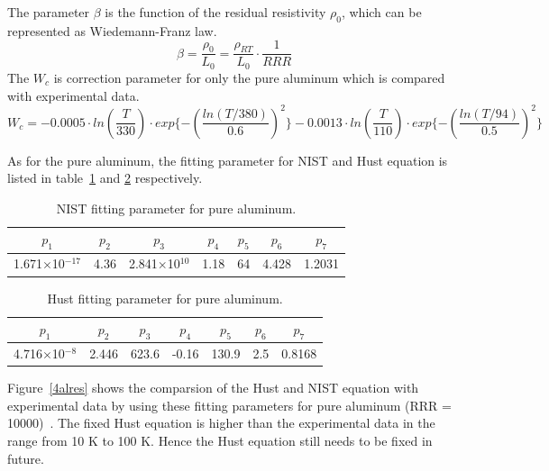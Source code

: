 The parameter $\beta$ is the function of the residual resistivity $\rho_0$, which can be represented as Wiedemann-Franz law.
\begin{equation}
 \beta = \frac{\rho_0}{L_0} = \frac{\rho_{RT}}{L_0} \cdot \frac{1}{RRR}
\end{equation}
The $W_c$ is correction parameter for only the pure aluminum which is compared with experimental data.
\begin{equation}
 W_c = -0.0005 \cdot ln(\frac{T}{330}) \cdot exp\{-(\frac{ln(T/380)}{0.6})^2\} -0.0013 \cdot ln(\frac{T}{110}) \cdot exp\{-(\frac{ln(T/94)}{0.5})^2\}
\end{equation}

As for the pure aluminum, the fitting parameter for NIST and Hust equation is listed in table~\ref{paraAl} and \ref{paraAl2} respectively.
\begin{table}[H]
 \centering
 \begin{tabular}{ccccccc} \hline \hline
  $p_1$ & $p_2$ & $p_3$ & $p_4$ & $p_5$ & $p_6$ & $p_7$ \\ \hline
  1.671$\times$10$^{-17}$ & 4.36 & 2.841$\times$10$^{10}$ & 1.18 & 64 & 4.428 & 1.2031 \\ \hline \hline
 \end{tabular}
 \caption{NIST fitting parameter for pure aluminum.}
 \label{paraAl}
\end{table}
\begin{table}[H]
 \centering
 \begin{tabular}{ccccccc} \hline \hline
  $p_1$ & $p_2$ & $p_3$ & $p_4$ & $p_5$ & $p_6$ & $p_7$ \\ \hline
  4.716$\times$10$^{-8}$ & 2.446 & 623.6 & -0.16 & 130.9 & 2.5 & 0.8168 \\ \hline \hline
 \end{tabular}
 \caption{Hust fitting parameter for pure aluminum.}
 \label{paraAl2}
\end{table}
Figure~\ref{4alres} shows the comparsion of the Hust and NIST equation with experimental data by using these fitting parameters for pure aluminum (RRR = 10000)~\cite{desai}.
The fixed Hust equation is higher than the experimental data in the range from 10 K to 100 K.
Hence the Hust equation still needs to be fixed in future.
